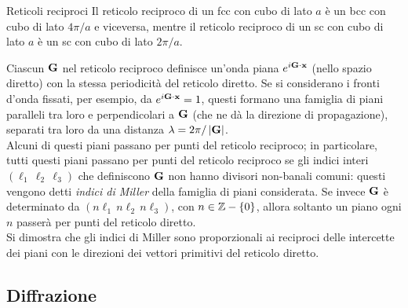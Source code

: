 \begin{example}{Reticoli reciproci}{}
	Il reticolo reciproco di un fcc con cubo di lato $ a $ è un bcc con cubo di lato $ 4\pi/a $ e viceversa, mentre il reticolo reciproco di un sc con cubo di lato $ a $ è un sc con cubo di lato $ 2\pi/a $.
\end{example}

Ciascun $ \mathbf{G} $ nel reticolo reciproco definisce un'onda piana $ e^{i \mathbf{G} \cdot \mathbf{x}} $ (nello spazio diretto) con la stessa periodicità del reticolo diretto. Se si considerano i fronti d'onda fissati, per esempio, da $ e^{i \mathbf{G} \cdot \mathbf{x}} = 1 $, questi formano una famiglia di piani paralleli tra loro e perpendicolari a $ \mathbf{G} $ (che ne dà la direzione di propagazione), separati tra loro da una distanza $ \lambda = 2\pi / \left\lvert\mathbf{G}\right\rvert $. \\
Alcuni di questi piani passano per punti del reticolo reciproco; in particolare, tutti questi piani passano per punti del reticolo reciproco se gli indici interi $ (\ell_1 \, \ell_2 \, \ell_3) $ che definiscono $ \mathbf{G} $ non hanno divisori non-banali comuni: questi vengono detti \textit{indici di Miller} della famiglia di piani considerata. Se invece $ \mathbf{G} $ è determinato da $ (n\ell_1 \, n\ell_2 \, n\ell_3) $, con $ n \in \mathbb{Z} - \{0\} $, allora soltanto un piano ogni $ n $ passerà per punti del reticolo diretto. \\
Si dimostra che gli indici di Miller sono proporzionali ai reciproci delle intercette dei piani con le direzioni dei vettori primitivi del reticolo diretto.

\subsection{Diffrazione}

